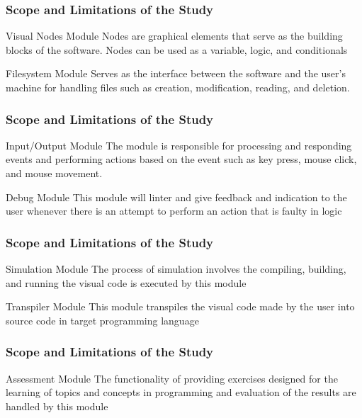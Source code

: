 \documentclass[handout]{beamer}
\begin{document}
\begin{frame}
	\frametitle{Scope and Limitations of the Study}
	\begin{block}{Visual Nodes Module}
		Nodes are graphical elements that serve as the building blocks of the
		software.  Nodes can be used as a variable, logic, and conditionals
	\end{block}
	\begin{block}{Filesystem Module}
		Serves as the interface between the software and the user’s machine for
		handling files such as creation, modification, reading, and deletion.
	\end{block}
\end{frame}

\begin{frame}
	\frametitle{Scope and Limitations of the Study}
	\begin{block}{Input/Output Module}
		The module is responsible for processing and responding events
		and performing actions based on the event such as key press, mouse click,
		and mouse movement.
	\end{block}
	\begin{block}{Debug Module}
		This module will linter and give feedback and indication to the user
		whenever there is an attempt to perform an action that is faulty in logic
	\end{block}
\end{frame}

\begin{frame}
	\frametitle{Scope and Limitations of the Study}
	\begin{block}{Simulation Module}
		The process of simulation involves the compiling, building, and running the
		visual code is executed by this module
	\end{block}
	\begin{block}{Transpiler Module}
		This module transpiles the visual code made by the user into source code in
		target programming language
	\end{block}
\end{frame}

\begin{frame}
	\frametitle{Scope and Limitations of the Study}
	\begin{block}{Assessment Module}
		The functionality of providing exercises designed for the learning of
		topics and concepts in programming and evaluation of the results are
		handled by this module
	\end{block}
\end{frame}
\end{document}
